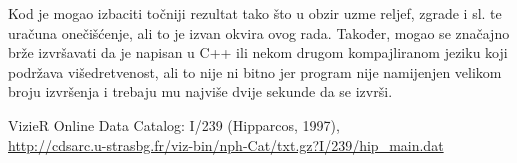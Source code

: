 \documentclass[a4paper,12pt]{article}
\begin{document}
Kod je mogao izbaciti točniji rezultat tako što u obzir uzme reljef, zgrade i sl. te uračuna onečišćenje, ali to je izvan okvira ovog rada. Također, mogao se značajno brže izvršavati da je napisan u C++ ili nekom drugom kompajliranom jeziku koji podržava višedretvenost, ali to nije ni bitno jer program nije namijenjen velikom broju izvršenja i trebaju mu najviše dvije sekunde da se izvrši.



\begin{thebibliography}{9}
  VizieR Online Data Catalog: I/239 (Hipparcos, 1997),\\
  \url{http://cdsarc.u-strasbg.fr/viz-bin/nph-Cat/txt.gz?I/239/hip\_main.dat}
\end{thebibliography}
\end{document}
